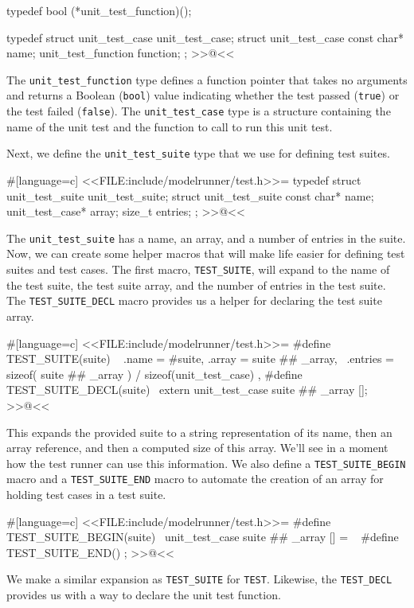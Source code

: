typedef bool (*unit_test_function)();

typedef struct unit_test_case unit_test_case;
struct unit_test_case
{
    const char* name;
    unit_test_function function;
};
>>@<<

The \verb/unit_test_function/ type defines a function pointer that takes no
arguments and returns a Boolean (\verb/bool/) value indicating whether the test
passed (\verb/true/) or the test failed (\verb/false/). The
\verb/unit_test_case/ type is a structure containing the name of the unit test
and the function to call to run this unit test.

Next, we define the \verb/unit_test_suite/ type that we use for defining test
suites.

#[language=c]
<<FILE:include/modelrunner/test.h>>=
typedef struct unit_test_suite unit_test_suite;
struct unit_test_suite
{
    const char* name;
    unit_test_case* array;
    size_t entries;
};
>>@<<

\newpage

The \verb/unit_test_suite/ has a name, an array, and a number of entries in the
suite. Now, we can create some helper macros that will make life easier for
defining test suites and test cases. The first macro, \verb/TEST_SUITE/, will
expand to the name of the test suite, the test suite array, and the number of
entries in the test suite. The \verb/TEST_SUITE_DECL/ macro provides us a helper
for declaring the test suite array.

#[language=c]
<<FILE:include/modelrunner/test.h>>=
#define TEST_SUITE(suite) \
    { .name = #suite, .array = suite ## _array, \
      .entries = sizeof( suite ## _array ) / sizeof(unit_test_case) },
#define TEST_SUITE_DECL(suite) \
    extern unit_test_case suite ## _array [];
>>@<<

This expands the provided suite to a string representation of its name, then an
array reference, and then a computed size of this array.  We'll see in a moment
how the test runner can use this information. We also define a
\verb/TEST_SUITE_BEGIN/ macro and a \verb/TEST_SUITE_END/ macro to automate the
creation of an array for holding test cases in a test suite.

#[language=c]
<<FILE:include/modelrunner/test.h>>=
#define TEST_SUITE_BEGIN(suite) \
    unit_test_case suite ## _array [] = \
    {
#define TEST_SUITE_END() };
>>@<<

We make a similar expansion as \verb/TEST_SUITE/ for \verb/TEST/. Likewise, the
\verb/TEST_DECL/ provides us with a way to declare the unit test function.

